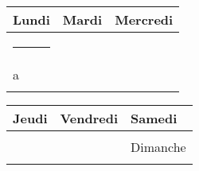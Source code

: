 \documentclass[11pt,a6paper,landscape]{article} %
\newlength{\daycellwidth}
\begin{document}
\begin{tabular}{|*{3}{p{\daycellwidth}|}} \hline
Lundi & Mardi & Mercredi \\ \hline
\rule{1pt}{\baselineskip} & & \\ \hline
a & & \\[2ex] \hline
 & & \\ \hline
\end{tabular}

\begin{tabular}{|*{3}{p{\daycellwidth}|}} \hline
Jeudi & Vendredi & Samedi \\ \hline
 & & \\ \cline{3-3}
         &        & Dimanche \\ \cline{3-3}
 & & \\ \hline
\end{tabular}
\end{document}
